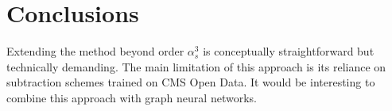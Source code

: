 \section{Conclusions}\label{sec:conclusions}

Extending the method beyond order $\alpha_s^3$ is conceptually
straightforward but technically demanding. The main limitation of this
approach is its reliance on subtraction schemes trained on CMS Open
Data. It would be interesting to combine this approach with graph neural
networks.

